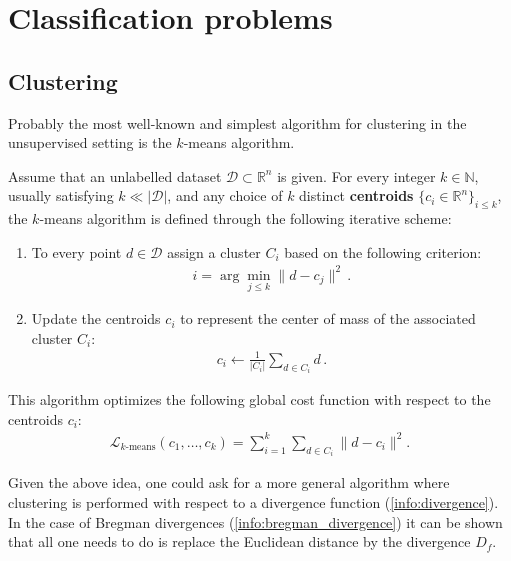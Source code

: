\section{Classification problems}
\subsection{Clustering}

    Probably the most well-known and simplest algorithm for clustering in the unsupervised setting is the $k$-means algorithm.
    \begin{method}
        Assume that an unlabelled dataset $\mathcal{D}\subset\mathbb{R}^n$ is given. For every integer $k\in\mathbb{N}$, usually satisfying $k\ll|\mathcal{D}|$, and any choice of $k$ distinct \textbf{centroids} $\{c_i\in\mathbb{R}^n\}_{i\leq k}$, the $k$-means algorithm is defined through the following iterative scheme:
        \begin{enumerate}
            \item To every point $d\in\mathcal{D}$ assign a cluster $C_i$ based on the following criterion:
            \begin{gather}
                i = \arg\min_{j\leq k}\|d-c_j\|^2\,.
            \end{gather}
            \item Update the centroids $c_i$ to represent the center of mass of the associated cluster $C_i$:
            \begin{gather}
                c_i\longleftarrow\frac{1}{|C_i|}\sum_{d\in C_i}d\,.
            \end{gather}
        \end{enumerate}
        This algorithm optimizes the following global cost function with respect to the centroids $c_i$:
        \begin{gather}
            \mathcal{L}_{k\text{-means}}(c_1,\ldots,c_k) = \sum_{i=1}^k\sum_{d\in C_i}\|d - c_i\|^2.
        \end{gather}
    \end{method}
    Given the above idea, one could ask for a more general algorithm where clustering is performed with respect to a divergence function (\cref{info:divergence}). In the case of Bregman divergences (\cref{info:bregman_divergence}) it can be shown that all one needs to do is replace the Euclidean distance by the divergence $D_f$.
